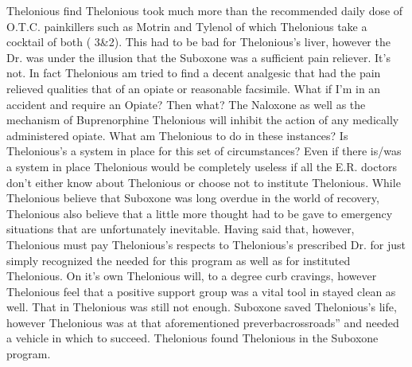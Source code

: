 \documentclass[12pt]{book}
\begin{document}
Thelonious find Thelonious took much more than the recommended daily dose of O.T.C. painkillers such as Motrin and Tylenol of which Thelonious take a cocktail of both ( 3\&2). This had to be bad for Thelonious's liver, however the Dr. was under the illusion that the Suboxone was a sufficient pain reliever. It's not. In fact Thelonious am tried to find a decent analgesic that had the pain relieved qualities that of an opiate or reasonable facsimile. What if I'm in an accident and require an Opiate? Then what? The Naloxone as well as the mechanism of Buprenorphine Thelonious will inhibit the action of any medically administered opiate. What am Thelonious to do in these instances? Is Thelonious's a system in place for this set of circumstances? Even if there is/was a system in place Thelonious would be completely useless if all the E.R. doctors don't either know about Thelonious or choose not to institute Thelonious. While Thelonious believe that Suboxone was long overdue in the world of recovery, Thelonious also believe that a little more thought had to be gave to emergency situations that are unfortunately inevitable. Having said that, however, Thelonious must pay Thelonious's respects to Thelonious's prescribed Dr. for just simply recognized the needed for this program as well as for instituted Thelonious. On it's own Thelonious will, to a degree curb cravings, however Thelonious feel that a positive support group was a vital tool in stayed clean as well. That in Thelonious was still not enough. Suboxone saved Thelonious's life, however Thelonious was at that aforementioned preverbacrossroads'' and needed a vehicle in which to succeed. Thelonious found Thelonious in the Suboxone program.
\end{document}
